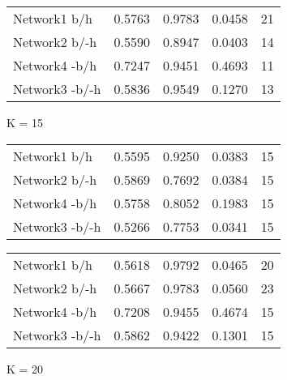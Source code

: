 \begin{table*}[h]
\begin{minipage}[h]{0.45\linewidth}
\begin{tabular}{lrrrr}
 Network1 b/h         &   0.5763 &      0.9783 &   0.0458 & 21 \\
 Network2 b/-h      &   0.5590 &      0.8947 &   0.0403 & 14 \\
 Network4 -b/h       &   0.7247 &      0.9451 &   0.4693 & 11 \\
 Network3 -b/-h     &   0.5836 &      0.9549 &   0.1270 & 13 \\
\hline
\end{tabular}
\end{minipage}


	\begin{minipage}[h]{0.45\linewidth} 
K = 15
\begin{tabular}{lrrrr}

 Network1 b/h           &   0.5595 &      0.9250 &   0.0383 & 15 \\
 Network2 b/-h        &   0.5869 &      0.7692 &   0.0384 & 15 \\
 Network4 -b/h         &   0.5758 &      0.8052 &   0.1983 & 15 \\
 Network3 -b/-h       &   0.5266 &      0.7753 &   0.0341 & 15 \\
\hline
\end{tabular}
\end{minipage}
\hspace{0.8cm}
\begin{minipage}[h]{0.45\linewidth}
\begin{tabular}{lrrrr}

 Network1 b/h         &   0.5618 &      0.9792 &   0.0465 & 20 \\
 Network2 b/-h      &   0.5667 &      0.9783 &   0.0560 & 23 \\
 Network4 -b/h       &   0.7208 &      0.9455 &   0.4674 & 15 \\
 Network3 -b/-h     &   0.5862 &      0.9422 &   0.1301 & 15 \\
\hline
\end{tabular}
\end{minipage}


	\begin{minipage}[h]{0.45\linewidth} 
K = 20
\begin{tabular}{lrrrr}


\end{tabular}
\end{minipage}
\end{table*}
